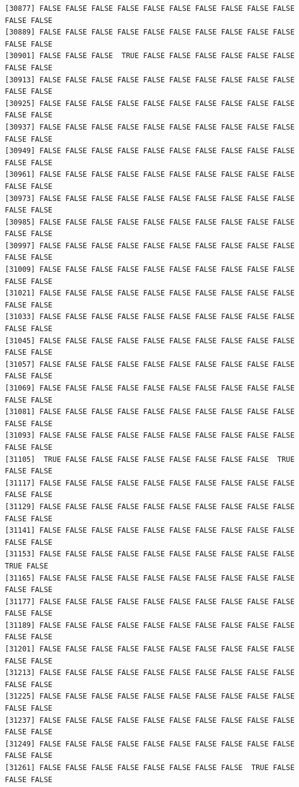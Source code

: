 \documentclass[
  a4paper,
  DIV=11,
  numbers=noendperiod]{scrartcl}
\begin{document}
\begin{verbatim}
[30877] FALSE FALSE FALSE FALSE FALSE FALSE FALSE FALSE FALSE FALSE FALSE FALSE
[30889] FALSE FALSE FALSE FALSE FALSE FALSE FALSE FALSE FALSE FALSE FALSE FALSE
[30901] FALSE FALSE FALSE  TRUE FALSE FALSE FALSE FALSE FALSE FALSE FALSE FALSE
[30913] FALSE FALSE FALSE FALSE FALSE FALSE FALSE FALSE FALSE FALSE FALSE FALSE
[30925] FALSE FALSE FALSE FALSE FALSE FALSE FALSE FALSE FALSE FALSE FALSE FALSE
[30937] FALSE FALSE FALSE FALSE FALSE FALSE FALSE FALSE FALSE FALSE FALSE FALSE
[30949] FALSE FALSE FALSE FALSE FALSE FALSE FALSE FALSE FALSE FALSE FALSE FALSE
[30961] FALSE FALSE FALSE FALSE FALSE FALSE FALSE FALSE FALSE FALSE FALSE FALSE
[30973] FALSE FALSE FALSE FALSE FALSE FALSE FALSE FALSE FALSE FALSE FALSE FALSE
[30985] FALSE FALSE FALSE FALSE FALSE FALSE FALSE FALSE FALSE FALSE FALSE FALSE
[30997] FALSE FALSE FALSE FALSE FALSE FALSE FALSE FALSE FALSE FALSE FALSE FALSE
[31009] FALSE FALSE FALSE FALSE FALSE FALSE FALSE FALSE FALSE FALSE FALSE FALSE
[31021] FALSE FALSE FALSE FALSE FALSE FALSE FALSE FALSE FALSE FALSE FALSE FALSE
[31033] FALSE FALSE FALSE FALSE FALSE FALSE FALSE FALSE FALSE FALSE FALSE FALSE
[31045] FALSE FALSE FALSE FALSE FALSE FALSE FALSE FALSE FALSE FALSE FALSE FALSE
[31057] FALSE FALSE FALSE FALSE FALSE FALSE FALSE FALSE FALSE FALSE FALSE FALSE
[31069] FALSE FALSE FALSE FALSE FALSE FALSE FALSE FALSE FALSE FALSE FALSE FALSE
[31081] FALSE FALSE FALSE FALSE FALSE FALSE FALSE FALSE FALSE FALSE FALSE FALSE
[31093] FALSE FALSE FALSE FALSE FALSE FALSE FALSE FALSE FALSE FALSE FALSE FALSE
[31105]  TRUE FALSE FALSE FALSE FALSE FALSE FALSE FALSE FALSE  TRUE FALSE FALSE
[31117] FALSE FALSE FALSE FALSE FALSE FALSE FALSE FALSE FALSE FALSE FALSE FALSE
[31129] FALSE FALSE FALSE FALSE FALSE FALSE FALSE FALSE FALSE FALSE FALSE FALSE
[31141] FALSE FALSE FALSE FALSE FALSE FALSE FALSE FALSE FALSE FALSE FALSE FALSE
[31153] FALSE FALSE FALSE FALSE FALSE FALSE FALSE FALSE FALSE FALSE  TRUE FALSE
[31165] FALSE FALSE FALSE FALSE FALSE FALSE FALSE FALSE FALSE FALSE FALSE FALSE
[31177] FALSE FALSE FALSE FALSE FALSE FALSE FALSE FALSE FALSE FALSE FALSE FALSE
[31189] FALSE FALSE FALSE FALSE FALSE FALSE FALSE FALSE FALSE FALSE FALSE FALSE
[31201] FALSE FALSE FALSE FALSE FALSE FALSE FALSE FALSE FALSE FALSE FALSE FALSE
[31213] FALSE FALSE FALSE FALSE FALSE FALSE FALSE FALSE FALSE FALSE FALSE FALSE
[31225] FALSE FALSE FALSE FALSE FALSE FALSE FALSE FALSE FALSE FALSE FALSE FALSE
[31237] FALSE FALSE FALSE FALSE FALSE FALSE FALSE FALSE FALSE FALSE FALSE FALSE
[31249] FALSE FALSE FALSE FALSE FALSE FALSE FALSE FALSE FALSE FALSE FALSE FALSE
[31261] FALSE FALSE FALSE FALSE FALSE FALSE FALSE FALSE  TRUE FALSE FALSE FALSE

\end{verbatim}
\end{document}
